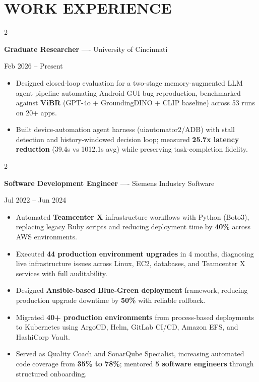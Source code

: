 \documentclass[10pt, letterpaper]{article}
\newenvironment{highlights}{
    \begin{itemize}[
        topsep=0.10 cm,
        parsep=0.06 cm,
        partopsep=0pt,
        itemsep=0.06 cm,
        leftmargin=12pt
    ]
}{
    \end{itemize}
}
\newenvironment{twocolentry}[2][]{
    \onecolentry
    \def\secondColumn{#2}
    \setcolumnwidth{\fill, 4.5 cm}
    \begin{paracol}{2}
}{
    \switchcolumn \raggedleft \secondColumn
    \end{paracol}
    \endonecolentry
}
\begin{document}
\section{WORK EXPERIENCE}
\begin{twocolentry}{Feb 2026 -- Present}
\textbf{Graduate Researcher} ---- University of Cincinnati
\end{twocolentry}
\begin{highlights}
  \item Designed closed-loop evaluation for a two-stage memory-augmented LLM agent pipeline automating Android GUI bug reproduction, benchmarked against \textbf{ViBR} (GPT-4o + GroundingDINO + CLIP baseline) across 53 runs on 20+ apps.
  \item Built device-automation agent harness (uiautomator2/ADB) with stall detection and history-windowed decision loop; measured \textbf{25.7x latency reduction} (39.4s vs 1012.1s avg) while preserving task-completion fidelity.
\end{highlights}

\vspace{0.15 cm}

\begin{twocolentry}{Jul 2022 -- Jun 2024}
\textbf{Software Development Engineer} ---- Siemens Industry Software
\end{twocolentry}
\begin{highlights}
  \item Automated \textbf{Teamcenter X} infrastructure workflows with Python (Boto3), replacing legacy Ruby scripts and reducing deployment time by \textbf{40\%} across AWS environments.
  \item Executed \textbf{44 production environment upgrades} in 4 months, diagnosing live infrastructure issues across Linux, EC2, databases, and Teamcenter X services with full auditability.
  \item Designed \textbf{Ansible-based Blue-Green deployment} framework, reducing production upgrade downtime by \textbf{50\%} with reliable rollback.
  \item Migrated \textbf{40+ production environments} from process-based deployments to Kubernetes using ArgoCD, Helm, GitLab CI/CD, Amazon EFS, and HashiCorp Vault.
  \item Served as Quality Coach and SonarQube Specialist, increasing automated code coverage from \textbf{35\% to 78\%}; mentored \textbf{5 software engineers} through structured onboarding.
\end{highlights}
\end{document}
